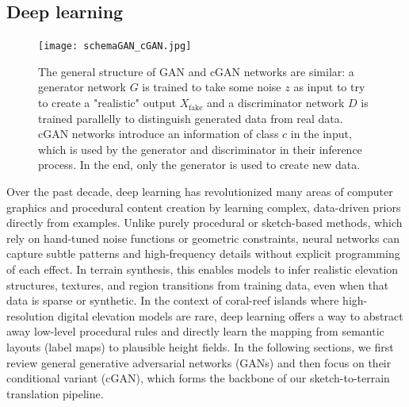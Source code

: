 



\subsection{Deep learning}
\label{sec:coral-island_sota-deep-learning}

\begin{figure}[H]
	\centering
	\texttt{[image: schemaGAN\_cGAN.jpg]}
    \caption{The general structure of GAN and cGAN networks are similar: a generator network $G$ is trained to take some noise $z$ as input to try to create a "realistic" output $X_{\text{fake}}$ and a discriminator network $D$ is trained parallelly to distinguish generated data from real data. cGAN networks introduce an information of class $c$ in the input, which is used by the generator and discriminator in their inference process. In the end, only the generator is used to create new data. }
    \label{fig:coral-island_GAN-scheme}
\end{figure}

Over the past decade, deep learning has revolutionized many areas of computer graphics and procedural content creation by learning complex, data-driven priors directly from examples. Unlike purely procedural or sketch-based methods, which rely on hand-tuned noise functions or geometric constraints, neural networks can capture subtle patterns and high-frequency details without explicit programming of each effect. In terrain synthesis, this enables models to infer realistic elevation structures, textures, and region transitions from training data, even when that data is sparse or synthetic. In the context of coral-reef islands where high-resolution digital elevation models are rare, deep learning offers a way to abstract away low-level procedural rules and directly learn the mapping from semantic layouts (label maps) to plausible height fields. In the following sections, we first review general generative adversarial networks (GANs) and then focus on their conditional variant (cGAN), which forms the backbone of our sketch-to-terrain translation pipeline.

